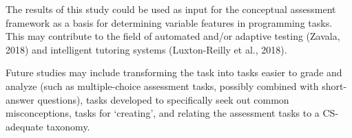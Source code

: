 The results of this study could be used as input for the conceptual assessment framework as a basis for determining variable features in programming tasks. This may contribute to the field of automated and/or adaptive testing (Zavala, 2018) and intelligent tutoring systems (Luxton-Reilly et al., 2018).


Future studies may include transforming the task into tasks easier to grade and analyze (such as multiple-choice assessment tasks, possibly combined with short-answer questions), tasks developed to specifically seek out common misconceptions, tasks for ‘creating’, and relating the assessment tasks to a CS-adequate taxonomy.

